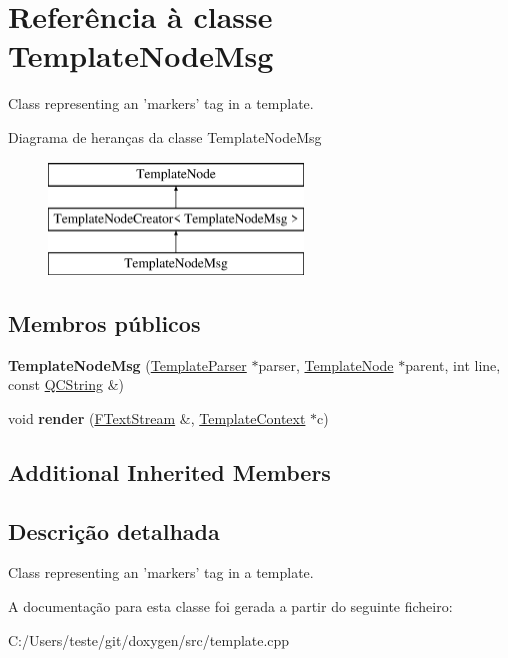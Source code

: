 \hypertarget{class_template_node_msg}{\section{Referência à classe Template\-Node\-Msg}
\label{class_template_node_msg}
}


Class representing an 'markers' tag in a template.  


Diagrama de heranças da classe Template\-Node\-Msg\begin{figure}[H]
\begin{center}
\leavevmode
\includegraphics[height=3.000000cm]{class_template_node_msg}
\end{center}
\end{figure}
\subsection*{Membros públicos}
\begin{DoxyCompactItemize}
\item 
\hypertarget{class_template_node_msg_a1a182a84fd2284307b703dbe53335a65}{{\bfseries Template\-Node\-Msg} (\hyperlink{class_template_parser}{Template\-Parser} $\ast$parser, \hyperlink{class_template_node}{Template\-Node} $\ast$parent, int line, const \hyperlink{class_q_c_string}{Q\-C\-String} \&)}\label{class_template_node_msg_a1a182a84fd2284307b703dbe53335a65}

\item 
\hypertarget{class_template_node_msg_a5146579a192ca5057a0be89f9da0220a}{void {\bfseries render} (\hyperlink{class_f_text_stream}{F\-Text\-Stream} \&, \hyperlink{class_template_context}{Template\-Context} $\ast$c)}\label{class_template_node_msg_a5146579a192ca5057a0be89f9da0220a}

\end{DoxyCompactItemize}
\subsection*{Additional Inherited Members}


\subsection{Descrição detalhada}
Class representing an 'markers' tag in a template. 

A documentação para esta classe foi gerada a partir do seguinte ficheiro\-:\begin{DoxyCompactItemize}
\item 
C\-:/\-Users/teste/git/doxygen/src/template.\-cpp\end{DoxyCompactItemize}

